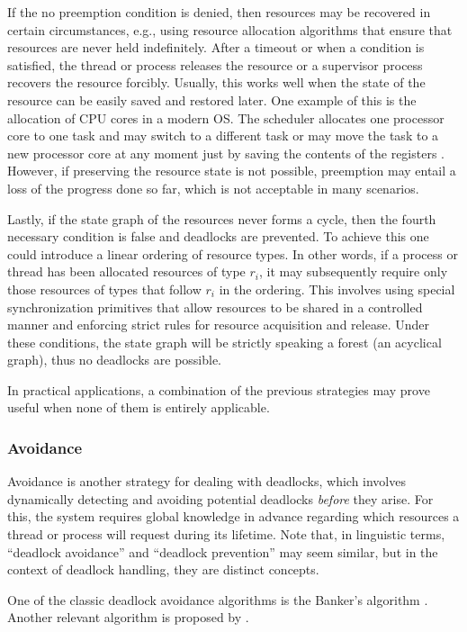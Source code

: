 If the no preemption condition is denied, then resources may be recovered
in certain circumstances, e.g., using resource allocation algorithms that
ensure that resources are never held indefinitely.
After a timeout or when a condition is satisfied,
the thread or process releases the resource
or a supervisor process recovers the resource forcibly.
Usually, this works well when the state of the resource can be easily saved
and restored later.
One example of this is the allocation of CPU cores in a modern \acrfull{OS}.
The scheduler allocates one processor core to one task and
may switch to a different task or
may move the task to a new processor core at any moment just
by saving the contents of the registers \cite[Chap. 6]{ArpaciDusseau2018}.
However, if preserving the resource state is not possible,
preemption may entail a loss of the progress done so far,
which is not acceptable in many scenarios.

Lastly, if the state graph of the resources never forms a cycle,
then the fourth necessary condition is false and deadlocks are prevented.
To achieve this one could introduce a linear ordering of resource types.
In other words, if a process or thread has been allocated resources of type $r_i$,
it may subsequently require only those resources
of types that follow $r_i$ in the ordering.
This involves using special synchronization primitives
that allow resources to be shared in a controlled manner and
enforcing strict rules for resource acquisition and release.
Under these conditions, the state graph will be strictly speaking
a forest (an acyclical graph), thus no deadlocks are possible.

In practical applications, a combination of the previous strategies may prove useful
when none of them is entirely applicable.
\subsubsection{Avoidance}

Avoidance is another strategy for dealing with deadlocks,
which involves dynamically detecting and
avoiding potential deadlocks \emph{before} they arise.
For this, the system requires global knowledge in advance regarding
which resources a thread or process will request during its lifetime.
Note that, in linguistic terms,
``deadlock avoidance'' and ``deadlock prevention'' may seem similar,
but in the context of deadlock handling, they are distinct concepts.

One of the classic deadlock avoidance algorithms
is the Banker's algorithm \cite{dijkstra1964}.
Another relevant algorithm is proposed by \cite{habermann1969prevention}.

